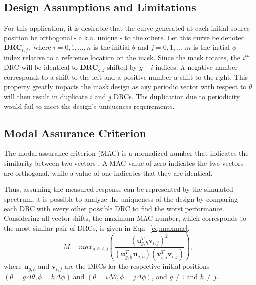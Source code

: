 \documentclass[twocolumn,10pt,final]{asme2ej}
\begin{document}
\vspace{-0.2 cm}
\subsection{Design Assumptions and Limitations}
For this application, it is desirable that the curve generated at each initial source position be orthogonal - a.k.a. unique - to the others.  
Let this curve be denoted $\mathbf{DRC}_{i,j},$ where $i=0,1,...,n$ is the initial $\theta$ and $j=0,1,...,m$ is the initial $\phi$ index relative to a reference location on the mask.  
Since the mask rotates, the $i^{th}$ DRC will be identical to $\mathbf{DRC}_{g,j}$ shifted by $g-i$ indices.  
A negative number corresponds to a shift to the left and a positive number a shift to the right.  
This property greatly impacts the mask design as any periodic vector with respect to $\theta$ will then result in duplicate $i$ and $g$ DRCs.  
The duplication due to periodicity would fail to meet the design's uniqueness requirements.

\vspace{-0.2 cm}
\subsection{Modal Assurance Criterion} \label{sec:MAC}
The modal assurance criterion (MAC) is a normalized number that indicates the similarity between two vectors \cite{Allemang03}.
A MAC value of zero indicates the two vectors are orthogonal, while a value of one indicates that they are identical.  

Thus, assuming the measured response can be represented by the simulated spectrum, it is possible to analyze the uniqueness of the design by comparing each DRC with every other possible DRC to find the worst performance.  Considering all vector shifts, the maximum MAC number, which corresponds to the most similar pair of DRCs, is given in Eqn.~\ref{eq:maxmac}.
\begin{equation}
M=max_{g,h,i,j}\left(\frac{\left(\mathbf{u}_{g,h}^T\mathbf{v}_{i,j}\right)^2}{\left(\mathbf{u}_{g,h}^T\mathbf{u}_{g,h}\right)\left(\mathbf{v}_{i,j}^T\mathbf{v}_{i,j}\right)}\right),
\label{eq:maxmac}
\end{equation}
\noindent where $\mathbf{u}_{g,h}$ and $\mathbf{v}_{i,j}$ are the DRCs for the respective initial positions $\left(\theta=g\Delta\theta,\phi=h\Delta\phi\right)$ and
$\left(\theta=i\Delta\theta,\phi=j\Delta\phi\right)$, and $g\neq i$ and $h\neq j$.
\end{document}
